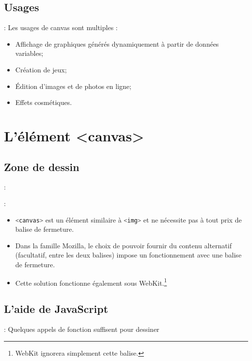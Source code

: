 \documentclass[10pt]{beamer}
\begin{document}
\subsection{Usages}
\begin{frame}{\secname : \subsecname}
    Les usages de canvas sont multiples :
    \begin{itemize}
        \item Affichage de graphiques générés dynamiquement à partir de données variables;
        \item Création de jeux;
        \item Édition d’images et de photos en ligne;
        \item Effets cosmétiques.
    \end{itemize}
\end{frame}
\section{L’élément <canvas>}
\tocss
\subsection{Zone de dessin}
\begin{frame}{\secname : \subsecname}
    
\end{frame}
\begin{frame}{\secname : \subsecname}
    \begin{itemize}
        \item \lstinline[language=sql]!<canvas>! est un élément similaire à \lstinline[language=sql]!<img>! et ne nécessite pas à tout prix de balise de fermeture.
        \item Dans la famille Mozilla, le choix de pouvoir fournir du contenu alternatif (facultatif, entre les deux balises) impose un fonctionnement avec une balise de fermeture.
        \item Cette solution fonctionne également sous WebKit.\footnote{WebKit ignorera simplement cette balise.}
    \end{itemize}
\end{frame}

\subsection{L’aide de JavaScript}
\begin{frame}{\secname : \subsecname}
    Quelques appels de fonction suffisent pour dessiner
    
\end{frame}
\end{document}

